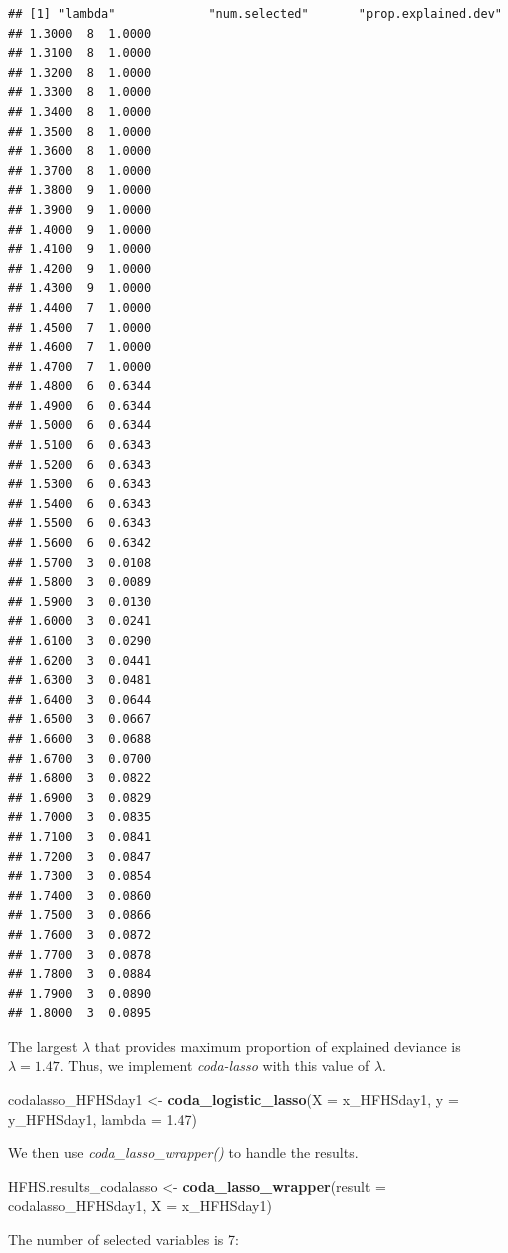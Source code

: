 \documentclass[openany]{book}
\newenvironment{Shaded}{\begin{snugshade}}{\end{snugshade}}
\newcommand{\KeywordTok}[1]{\textcolor[rgb]{0.13,0.29,0.53}{\textbf{#1}}}
\newcommand{\DataTypeTok}[1]{\textcolor[rgb]{0.13,0.29,0.53}{#1}}
\newcommand{\FloatTok}[1]{\textcolor[rgb]{0.00,0.00,0.81}{#1}}
\newcommand{\StringTok}[1]{\textcolor[rgb]{0.31,0.60,0.02}{#1}}
\newcommand{\NormalTok}[1]{#1}
\begin{document}
\begin{verbatim}
## [1] "lambda"             "num.selected"       "prop.explained.dev"
## 1.3000  8  1.0000
## 1.3100  8  1.0000
## 1.3200  8  1.0000
## 1.3300  8  1.0000
## 1.3400  8  1.0000
## 1.3500  8  1.0000
## 1.3600  8  1.0000
## 1.3700  8  1.0000
## 1.3800  9  1.0000
## 1.3900  9  1.0000
## 1.4000  9  1.0000
## 1.4100  9  1.0000
## 1.4200  9  1.0000
## 1.4300  9  1.0000
## 1.4400  7  1.0000
## 1.4500  7  1.0000
## 1.4600  7  1.0000
## 1.4700  7  1.0000
## 1.4800  6  0.6344
## 1.4900  6  0.6344
## 1.5000  6  0.6344
## 1.5100  6  0.6343
## 1.5200  6  0.6343
## 1.5300  6  0.6343
## 1.5400  6  0.6343
## 1.5500  6  0.6343
## 1.5600  6  0.6342
## 1.5700  3  0.0108
## 1.5800  3  0.0089
## 1.5900  3  0.0130
## 1.6000  3  0.0241
## 1.6100  3  0.0290
## 1.6200  3  0.0441
## 1.6300  3  0.0481
## 1.6400  3  0.0644
## 1.6500  3  0.0667
## 1.6600  3  0.0688
## 1.6700  3  0.0700
## 1.6800  3  0.0822
## 1.6900  3  0.0829
## 1.7000  3  0.0835
## 1.7100  3  0.0841
## 1.7200  3  0.0847
## 1.7300  3  0.0854
## 1.7400  3  0.0860
## 1.7500  3  0.0866
## 1.7600  3  0.0872
## 1.7700  3  0.0878
## 1.7800  3  0.0884
## 1.7900  3  0.0890
## 1.8000  3  0.0895
\end{verbatim}

The largest \(\lambda\) that provides maximum proportion of explained
deviance is \(\lambda = 1.47\). Thus, we implement \emph{coda-lasso}
with this value of \(\lambda\).

\begin{Shaded}
\begin{Highlighting}[]
\NormalTok{codalasso_HFHSday1 <-}\StringTok{ }\KeywordTok{coda_logistic_lasso}\NormalTok{(}\DataTypeTok{X =}\NormalTok{ x_HFHSday1, }\DataTypeTok{y =}\NormalTok{ y_HFHSday1, }\DataTypeTok{lambda =} \FloatTok{1.47}\NormalTok{)}
\end{Highlighting}
\end{Shaded}

We then use \emph{coda\_lasso\_wrapper()} to handle the results.

\begin{Shaded}
\begin{Highlighting}[]
\NormalTok{HFHS.results_codalasso <-}\StringTok{ }\KeywordTok{coda_lasso_wrapper}\NormalTok{(}\DataTypeTok{result =}\NormalTok{ codalasso_HFHSday1, }\DataTypeTok{X =}\NormalTok{ x_HFHSday1) }
\end{Highlighting}
\end{Shaded}

The number of selected variables is 7:
\end{document}
